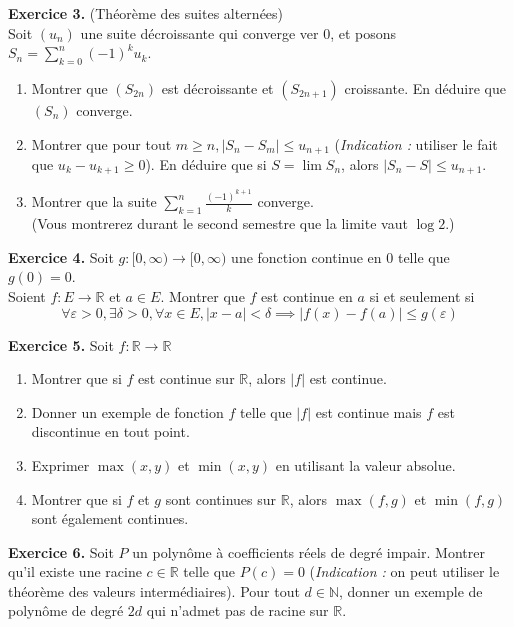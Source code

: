\documentclass[a4paper, 10pt]{report}
\providecommand{\abs}[1]{\lvert#1\rvert}
\begin{document}
	\vspace{5mm}
	\noindent
	\textbf{Exercice 3.} (Théorème des suites alternées)\\
	Soit $(u_n)$ une suite décroissante qui converge ver 0, et posons
	$\displaystyle S_n = \sum_{k=0}^{n}(-1)^ku_k$.
	\begin{enumerate}[label=(\roman*)]
		\item Montrer que $(S_{2n})$ est décroissante et  $(S_{2n+1})$
		croissante. En déduire que  $(S_n)$ converge.
		\item Montrer que pour tout $m \geq n, \abs{S_n - S_m} \leq u_{n+1}$
		(\textit{Indication :} utiliser le fait que $u_k - u_{k+1} \geq 0$).
		En déduire que si $S = \lim S_n$, alors $\abs{S_n - S} \leq u_{n+1}$.
		\item Montrer que la suite $\displaystyle
			\sum_{k=1}^{n}\frac{(-1)^{k+1}}{k}$ converge.\\
		(Vous montrerez durant le second semestre que la limite vaut
		$\log2$.)
	\end{enumerate}
	
	
	\vspace{5mm}
	\noindent
	\textbf{Exercice 4.} Soit $g: [0, \infty) \to [0, \infty)$ une
	fonction continue en 0 telle que $g(0) = 0$.\\
	Soient $f: E \to \mathbb{R}$ et $a \in E$.
	Montrer que $f$ est continue en $a$ si et seulement si
	\[
		\forall \varepsilon > 0, \exists \delta > 0, \forall x \in E,
		\abs{x - a} < \delta \implies \abs{f(x) - f(a)} \leq g(\varepsilon)
	\]
		
	\vspace{5mm}
	\noindent
	\textbf{Exercice 5.} Soit $f : \mathbb{R} \to \mathbb{R}$
	\begin{enumerate}[label=(\roman*)]
		\item Montrer que si $f$ est continue sur $\mathbb{R}$, alors
		$\abs{f}$ est continue.
		\item Donner un exemple de fonction $f$ telle que $\abs{f}$ est
		continue mais $f$ est discontinue en tout point. 
		\item Exprimer $\max(x, y)$ et $\min(x, y)$ en utilisant la
		valeur absolue.
		\item Montrer que si $f$ et $g$ sont continues sur $\mathbb{R}$,
		alors $\max(f, g)$ et $\min(f, g)$ sont également continues.
	\end{enumerate}
	
	\newpage
	
	\vspace{5mm}
	\noindent
	\textbf{Exercice 6.} Soit $P$ un polynôme à coefficients réels de
	degré impair. Montrer qu'il existe une racine $c \in \mathbb{R}$
	telle que $P(c) = 0$ (\textit{Indication :} on peut utiliser le
	théorème des valeurs intermédiaires). Pour tout $d \in \mathbb{N}$,
	donner un exemple de polynôme de degré $2d$ qui n'admet pas de
	racine sur $\mathbb{R}$.
	
\end{document}

